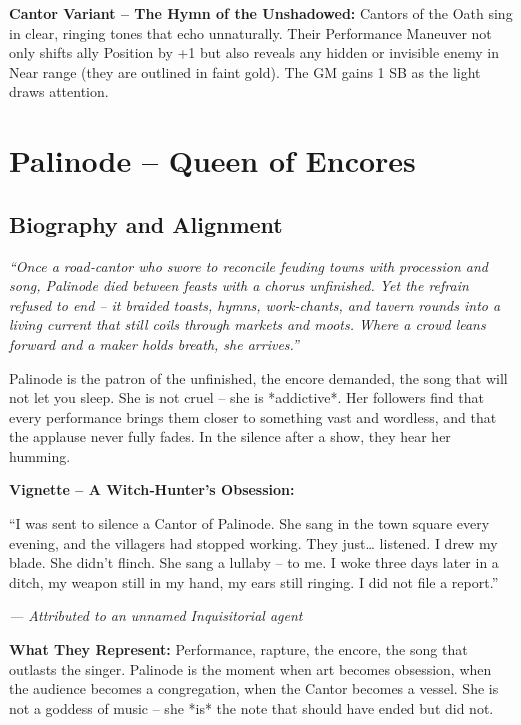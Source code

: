 \documentclass[10pt,a5paper]{book}
\begin{document}
\noindent \textbf{Cantor Variant – The Hymn of the Unshadowed:}
Cantors of the Oath sing in clear, ringing tones that echo unnaturally. Their Performance Maneuver not only shifts ally Position by +1 but also reveals any hidden or invisible enemy in Near range (they are outlined in faint gold). The GM gains 1 SB as the light draws attention.

\clearpage

\section{Palinode – Queen of Encores}
\label{patron:palinode}

\subsection*{Biography and Alignment}

\textit{“Once a road‑cantor who swore to reconcile feuding towns with procession and song, Palinode died between feasts with a chorus unfinished. Yet the refrain refused to end – it braided toasts, hymns, work‑chants, and tavern rounds into a living current that still coils through markets and moots. Where a crowd leans forward and a maker holds breath, she arrives.”}

Palinode is the patron of the unfinished, the encore demanded, the song that will not let you sleep. She is not cruel – she is *addictive*. Her followers find that every performance brings them closer to something vast and wordless, and that the applause never fully fades. In the silence after a show, they hear her humming.

\textbf{Vignette – A Witch‑Hunter’s Obsession:}
\epigraph{“I was sent to silence a Cantor of Palinode. She sang in the town square every evening, and the villagers had stopped working. They just… listened. I drew my blade. She didn’t flinch. She sang a lullaby – to me. I woke three days later in a ditch, my weapon still in my hand, my ears still ringing. I did not file a report.”}{\textit{— Attributed to an unnamed Inquisitorial agent}}

\textbf{What They Represent:} Performance, rapture, the encore, the song that outlasts the singer. Palinode is the moment when art becomes obsession, when the audience becomes a congregation, when the Cantor becomes a vessel. She is not a goddess of music – she *is* the note that should have ended but did not.
\end{document}
